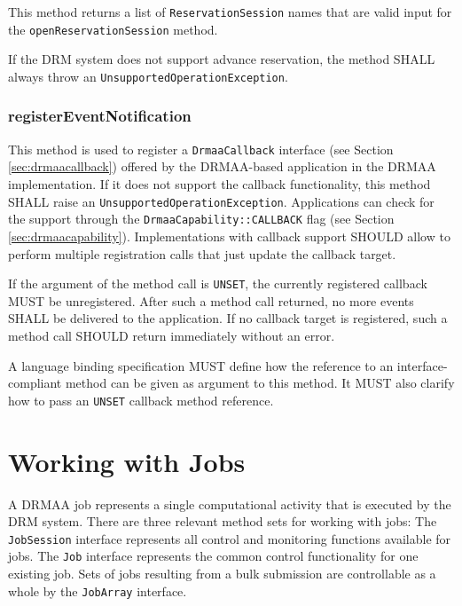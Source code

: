 \documentclass{article}
\newcommand{\h}[1]{\lstinline|#1|}
\newcommand{\langbind}[1]{\begin{shaded}#1\end{shaded}}
\newcommand{\rat}[1]{}
\begin{document}
This method returns a list of \h{ReservationSession} names that are valid input for the \h{openReservationSession} method.

If the DRM system does not support advance reservation, the method SHALL always throw an \h{UnsupportedOperationException}.

\rat{June 29th 2011 conf call decided to make the method names explicit enough to see the return type.}


\subsubsection{registerEventNotification}

This method is used to register a \h{DrmaaCallback} interface (see Section \ref{sec:drmaacallback}) offered by the DRMAA-based application in the DRMAA implementation. If it does not support the callback functionality, this method SHALL raise an \h{UnsupportedOperationException}. Applications can check for the support through the \h{DrmaaCapability::CALLBACK} flag (see Section \ref{sec:drmaacapability}). Implementations with callback support SHOULD allow to perform multiple registration calls that just update the callback target. 

If the argument of the method call is \h{UNSET}, the currently registered callback MUST be unregistered. After such a method call returned, no more events SHALL be delivered to the application. If no callback target is registered, such a method call SHOULD return immediately without an error. 

\langbind{
A language binding specification MUST define how the reference to an interface-compliant method can be given as argument to this method. It MUST also clarify how to pass an \h{UNSET} callback method reference.
}	

\section{Working with Jobs}

A DRMAA job represents a single computational activity that is executed by the DRM system. There are three relevant method sets for working with jobs: The \h{JobSession} interface represents all control and monitoring functions available for jobs. The \h{Job} interface represents the common control functionality for one existing job. Sets of jobs resulting from a bulk submission are controllable as a whole by the \h{JobArray} interface. 
\end{document}

